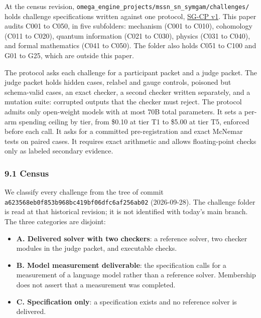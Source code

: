\documentclass[
  11pt,
]{article}
\providecommand{\tightlist}{%
  \setlength{\itemsep}{0pt}\setlength{\parskip}{0pt}}
\begin{document}
At the census revision,
\nolinkurl{omega_engine_projects/mssn_sn_symgam/challenges/} holds
challenge specifications written against one protocol,
\href{https://github.com/dbccpage/the_symbol_game/blob/a623568eb0f853b968bc419bf06dfc6af256ab02/omega_engine_projects/mssn_sn_symgam/challenges/01_challenge_protocol.md}{SG-CP
v1}. This paper audits C001 to C050, in five subfolders: mechanism (C001
to C010), cohomology (C011 to C020), quantum information (C021 to C030),
physics (C031 to C040), and formal mathematics (C041 to C050). The
folder also holds C051 to C100 and G01 to G25, which are outside this
paper.

The protocol asks each challenge for a participant packet and a judge
packet. The judge packet holds hidden cases, relabel and gauge controls,
poisoned but schema-valid cases, an exact checker, a second checker
written separately, and a mutation suite: corrupted outputs that the
checker must reject. The protocol admits only open-weight models with at
most 70B total parameters. It sets a per-arm spending ceiling by tier,
from \$0.10 at tier T1 to \$5.00 at tier T5, enforced before each call.
It asks for a committed pre-registration and exact McNemar tests on
paired cases. It requires exact arithmetic and allows floating-point
checks only as labeled secondary evidence.

\hypertarget{census}{%
\subsubsection{9.1 Census}\label{census}}

We classify every challenge from the tree of commit
\nolinkurl{a623568eb0f853b968bc419bf06dfc6af256ab02} (2026-09-28). The
challenge folder is read at that historical revision; it is not
identified with today's main branch. The three categories are disjoint:

\begin{itemize}
\tightlist
\item
  \textbf{A. Delivered solver with two checkers}: a reference solver,
  two checker modules in the judge packet, and executable checks.
\item
  \textbf{B. Model measurement deliverable}: the specification calls for
  a measurement of a language model rather than a reference solver.
  Membership does not assert that a measurement was completed.
\item
  \textbf{C. Specification only}: a specification exists and no
  reference solver is delivered.
\end{itemize}
\end{document}
